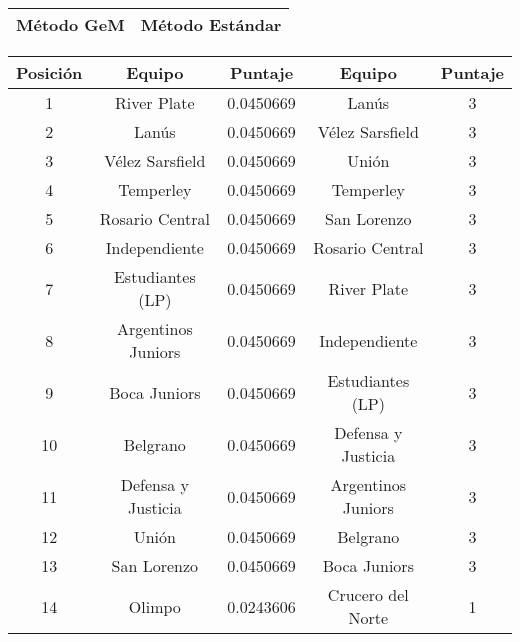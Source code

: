 \begin{table}[H]
	\center
	\begin{flushright}
	\begin{tabular}{| m{} || m{} |}
		\rowcolor{LightCyan}
		\hline Método GeM & Método Estándar \\ \hline
	\end{tabular}

	\begin{tabular}{| c | c | c || c | c |}
	  	\hline
	  	\rowcolor{LightCyan}
	  	Posición & Equipo & Puntaje & Equipo & Puntaje \\ \hline \hline
		1 & \cellcolor{green!20}River Plate & 0.0450669 & \cellcolor{green!20}Lanús & 3 \\ \hline
		2 & \cellcolor{green!20}Lanús & 0.0450669 & \cellcolor{green!20}Vélez Sarsfield & 3 \\ \hline 
		3 & \cellcolor{green!20}Vélez Sarsfield & 0.0450669 & \cellcolor{green!20}Unión & 3 \\ \hline 
		4 & \cellcolor{green!20}Temperley & 0.0450669 & \cellcolor{green!20}Temperley & 3 \\ \hline 
		5 & \cellcolor{green!20}Rosario Central & 0.0450669 & \cellcolor{green!20}San Lorenzo & 3 \\ \hline 
		6 & \cellcolor{green!20}Independiente & 0.0450669 & \cellcolor{green!20}Rosario Central & 3 \\ \hline 
		7 & \cellcolor{green!20}Estudiantes (LP) & 0.0450669 & \cellcolor{green!20}River Plate & 3 \\ \hline 
		8 & \cellcolor{green!20}Argentinos Juniors & 0.0450669 & \cellcolor{green!20}Independiente & 3 \\ \hline 
		9 & \cellcolor{green!20}Boca Juniors & 0.0450669 & \cellcolor{green!20}Estudiantes (LP) & 3 \\ \hline 
		10 & \cellcolor{green!20}Belgrano & 0.0450669 & \cellcolor{green!20}Defensa y Justicia & 3 \\ \hline 
		11 & \cellcolor{green!20}Defensa y Justicia & 0.0450669 & \cellcolor{green!20}Argentinos Juniors & 3 \\ \hline 
		12 & \cellcolor{green!20}Unión & 0.0450669 & \cellcolor{green!20}Belgrano & 3 \\ \hline 
		13 & \cellcolor{green!20}San Lorenzo & 0.0450669 & \cellcolor{green!20}Boca Juniors & 3 \\ \hline
		14 & \cellcolor{yellow!20}Olimpo & 0.0243606 & \cellcolor{yellow!20}Crucero del Norte & 1 \\ \hline

\end{tabular}
\end{flushright}
\end{table}
